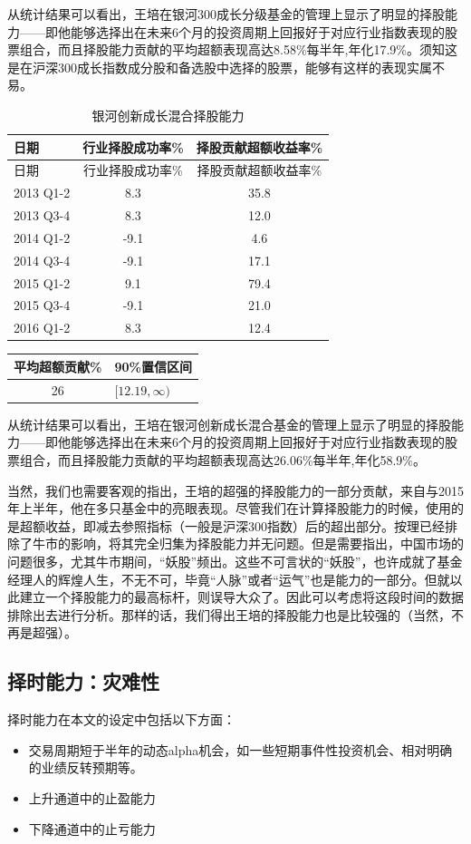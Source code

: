 \documentclass[hyperref,]{ctexart}
\providecommand{\tightlist}{%
  \setlength{\itemsep}{0pt}\setlength{\parskip}{0pt}}
\begin{document}
从统计结果可以看出，王培在银河300成长分级基金的管理上显示了明显的择股能力------即他能够选择出在未来6个月的投资周期上回报好于对应行业指数表现的股票组合，而且择股能力贡献的平均超额表现高达8.58\%每半年,年化17.9\%。须知这是在沪深300成长指数成分股和备选股中选择的股票，能够有这样的表现实属不易。

\begin{longtable}[]{@{}lcc@{}}
\caption{银河创新成长混合择股能力}\tabularnewline
\toprule
日期 & 行业择股成功率\% & 择股贡献超额收益率\%\tabularnewline
\midrule
\endfirsthead
\toprule
日期 & 行业择股成功率\% & 择股贡献超额收益率\%\tabularnewline
\midrule
\endhead
2013 Q1-2 & 8.3 & 35.8\tabularnewline
2013 Q3-4 & 8.3 & 12.0\tabularnewline
2014 Q1-2 & -9.1 & 4.6\tabularnewline
2014 Q3-4 & -9.1 & 17.1\tabularnewline
2015 Q1-2 & 9.1 & 79.4\tabularnewline
2015 Q3-4 & -9.1 & 21.0\tabularnewline
2016 Q1-2 & 8.3 & 12.4\tabularnewline
\bottomrule
\end{longtable}

\begin{longtable}[]{@{}cl@{}}
\toprule
平均超额贡献\% & 90\%置信区间\tabularnewline
\midrule
\endhead
26 & \([12.19,\infty)\)\tabularnewline
\bottomrule
\end{longtable}

从统计结果可以看出，王培在银河创新成长混合基金的管理上显示了明显的择股能力------即他能够选择出在未来6个月的投资周期上回报好于对应行业指数表现的股票组合，而且择股能力贡献的平均超额表现高达26.06\%每半年,年化58.9\%。

当然，我们也需要客观的指出，王培的超强的择股能力的一部分贡献，来自与2015年上半年，他在多只基金中的亮眼表现。尽管我们在计算择股能力的时候，使用的是超额收益，即减去参照指标（一般是沪深300指数）后的超出部分。按理已经排除了牛市的影响，将其完全归集为择股能力并无问题。但是需要指出，中国市场的问题很多，尤其牛市期间，``妖股''频出。这些不可言状的``妖股''，也许成就了基金经理人的辉煌人生，不无不可，毕竟``人脉''或者``运气''也是能力的一部分。但就以此建立一个择股能力的最高标杆，则误导大众了。因此可以考虑将这段时间的数据排除出去进行分析。那样的话，我们得出王培的择股能力也是比较强的（当然，不再是超强）。

\subsection{择时能力：灾难性}

择时能力在本文的设定中包括以下方面：

\begin{itemize}
\tightlist
\item
  交易周期短于半年的动态alpha机会，如一些短期事件性投资机会、相对明确的业绩反转预期等。
\item
  上升通道中的止盈能力
\item
  下降通道中的止亏能力
\end{itemize}
\end{document}
